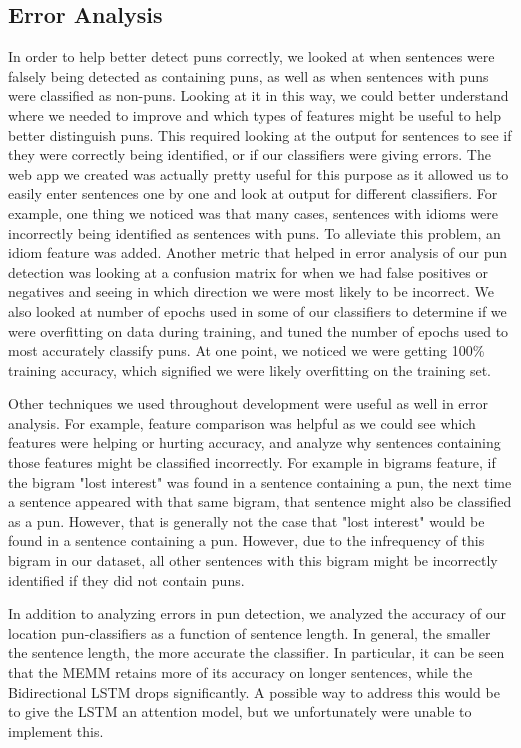 \documentclass{article}
\begin{document}
\subsection{Error Analysis}

In order to help better detect puns correctly, we looked at when sentences were falsely being detected as containing puns, as well as when sentences with puns were classified as non-puns. Looking at it in this way, we could better understand where we needed to improve and which types of features might be useful to help better distinguish puns. This required looking at the output for sentences to see if they were correctly being identified, or if our classifiers were giving errors. The web app we created was actually pretty useful for this purpose as it allowed us to easily enter sentences one by one and look at output for different classifiers. For example, one thing we noticed was that many cases, sentences with idioms were incorrectly being identified as sentences with puns. To alleviate this problem, an idiom feature was added. Another metric that helped in error analysis of our pun detection was looking at a confusion matrix for when we had false positives or negatives and seeing in which direction we were most likely to be incorrect. We also looked at number of epochs used in some of our classifiers to determine if we were overfitting on data during training, and tuned the number of epochs used to most accurately classify puns. At one point, we noticed we were getting 100\% training accuracy, which signified we were likely overfitting on the training set.

Other techniques we used throughout development were useful as well in error analysis. For example, feature comparison was helpful as we could see which features were helping or hurting accuracy, and analyze why sentences containing those features might be classified incorrectly. For example in bigrams feature, if the bigram "lost interest" was found in a sentence containing a pun, the next time a sentence appeared with that same bigram, that sentence might also be classified as a pun. However, that is generally not the case that "lost interest" would be found in a sentence containing a pun. However, due to the infrequency of this bigram in our dataset, all other sentences with this bigram might be incorrectly identified if they did not contain puns. 

In addition to analyzing errors in pun detection, we analyzed the accuracy of our location pun-classifiers as a function of
sentence length. In general, the smaller the sentence length, the more accurate
the classifier. In particular, it can be seen that the MEMM retains more of its
accuracy on longer sentences, while the Bidirectional LSTM drops significantly. 
A possible way to address this would be to give the LSTM an attention model, but
we unfortunately were unable to implement this.
\end{document}
